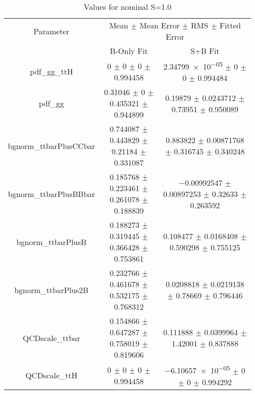 \begin{table}
\centering
\caption{Values for nominal S=1.0}
\begin{tabular}{ccc}
\toprule
Parameter & \multicolumn{2}{c}{Mean $\pm$ Mean Error $\pm$ RMS $\pm$ Fitted Error}\\
 & B-Only Fit & S+B Fit\\
\midrule
pdf\_gg\_ttH & \num{0} $\pm$ \num{0} $\pm$ \num{0} $\pm$ \num{0.994458} & \num{2.34799e-05} $\pm$ \num{0} $\pm$ \num{0} $\pm$ \num{0.994484}\\
pdf\_gg & \num{0.31046} $\pm$ \num{0} $\pm$ \num{0.435321} $\pm$ \num{0.944899} & \num{0.19879} $\pm$ \num{0.0243712} $\pm$ \num{0.73951} $\pm$ \num{0.950089}\\
bgnorm\_ttbarPlusCCbar & \num{0.744087} $\pm$ \num{0.443829} $\pm$ \num{0.21184} $\pm$ \num{0.331087} & \num{0.883822} $\pm$ \num{0.00871768} $\pm$ \num{0.316745} $\pm$ \num{0.340248}\\
bgnorm\_ttbarPlusBBbar & \num{0.185768} $\pm$ \num{0.223461} $\pm$ \num{0.261078} $\pm$ \num{0.188839} & \num{-0.00992547} $\pm$ \num{0.00897253} $\pm$ \num{0.32633} $\pm$ \num{0.263592}\\
bgnorm\_ttbarPlusB & \num{0.188273} $\pm$ \num{0.319445} $\pm$ \num{0.366428} $\pm$ \num{0.753861} & \num{0.108477} $\pm$ \num{0.0168408} $\pm$ \num{0.590298} $\pm$ \num{0.755125}\\
bgnorm\_ttbarPlus2B & \num{0.232766} $\pm$ \num{0.461678} $\pm$ \num{0.532175} $\pm$ \num{0.768312} & \num{0.0208818} $\pm$ \num{0.0219138} $\pm$ \num{0.78669} $\pm$ \num{0.796446}\\
QCDscale\_ttbar & \num{0.154866} $\pm$ \num{0.647287} $\pm$ \num{0.758019} $\pm$ \num{0.819606} & \num{0.111888} $\pm$ \num{0.0399964} $\pm$ \num{1.42001} $\pm$ \num{0.837888}\\
QCDscale\_ttH & \num{0} $\pm$ \num{0} $\pm$ \num{0} $\pm$ \num{0.994458} & \num{-6.10657e-05} $\pm$ \num{0} $\pm$ \num{0} $\pm$ \num{0.994292}\\
\bottomrule
\end{tabular}
\end{table}